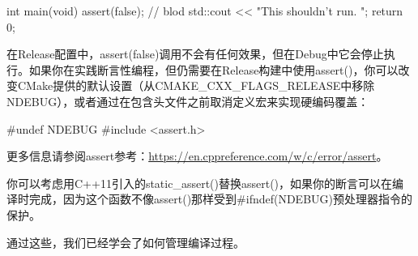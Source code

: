 \begin{cpp}
int main(void)
{
    assert(false); // blod
    std::cout << "This shouldn't run. \n";
    return 0;
}
\end{cpp}

在Release配置中，assert(false)调用不会有任何效果，但在Debug中它会停止执行。如果你在实践断言性编程，但仍需要在Release构建中使用assert()，你可以改变CMake提供的默认设置（从CMAKE\_CXX\_FLAGS\_RELEASE中移除NDEBUG），或者通过在包含头文件之前取消定义宏来实现硬编码覆盖：

\begin{cpp}
#undef NDEBUG
#include <assert.h>
\end{cpp}

更多信息请参阅assert参考：\url{https://en.cppreference.com/w/c/error/assert}。

你可以考虑用C++11引入的static\_assert()替换assert()，如果你的断言可以在编译时完成，因为这个函数不像assert()那样受到\#ifndef(NDEBUG)预处理器指令的保护。

通过这些，我们已经学会了如何管理编译过程。












